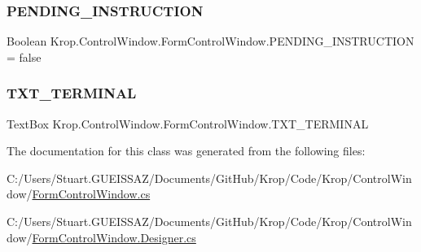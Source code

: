 \subsubsection{\texorpdfstring{P\+E\+N\+D\+I\+N\+G\+\_\+\+I\+N\+S\+T\+R\+U\+C\+T\+I\+ON}{PENDING\_INSTRUCTION}}
{\footnotesize\ttfamily Boolean Krop.\+Control\+Window.\+Form\+Control\+Window.\+P\+E\+N\+D\+I\+N\+G\+\_\+\+I\+N\+S\+T\+R\+U\+C\+T\+I\+ON = false\hspace{0.3cm}{\ttfamily [static]}}

\mbox{\label{class_krop_1_1_control_window_1_1_form_control_window_a107b67a284d28a7540f4f2adc40d6ec8}} 
\subsubsection{\texorpdfstring{T\+X\+T\+\_\+\+T\+E\+R\+M\+I\+N\+AL}{TXT\_TERMINAL}}
{\footnotesize\ttfamily Text\+Box Krop.\+Control\+Window.\+Form\+Control\+Window.\+T\+X\+T\+\_\+\+T\+E\+R\+M\+I\+N\+AL\hspace{0.3cm}{\ttfamily [static]}}



The documentation for this class was generated from the following files\+:\begin{DoxyCompactItemize}
\item 
C\+:/\+Users/\+Stuart.\+G\+U\+E\+I\+S\+S\+A\+Z/\+Documents/\+Git\+Hub/\+Krop/\+Code/\+Krop/\+Control\+Window/\mbox{\hyperlink{_form_control_window_8cs}{Form\+Control\+Window.\+cs}}\item 
C\+:/\+Users/\+Stuart.\+G\+U\+E\+I\+S\+S\+A\+Z/\+Documents/\+Git\+Hub/\+Krop/\+Code/\+Krop/\+Control\+Window/\mbox{\hyperlink{_form_control_window_8_designer_8cs}{Form\+Control\+Window.\+Designer.\+cs}}\end{DoxyCompactItemize}
